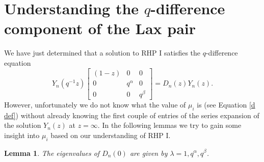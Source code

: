 \documentclass[a4paper,reqno]{amsart}
\numberwithin{equation}{section}
\newtheorem{lemma}[theorem]{Lemma}
\numberwithin{figure}{section}
\begin{document}
\section{Understanding the $q$-difference component of the Lax pair}
We have just determined that a solution to RHP I satisfies the $q$-difference equation 
\begin{equation}\label{the main diff}
    Y_n(q^{-1}z) \begin{bmatrix}
   (1-z) &
   0 &
   0 \\
   0 &
   q^{\alpha} &
   0\\
   0&0&q^{\beta}
\end{bmatrix} = D_n(z)Y_n(z).
\end{equation}
However, unfortunately we do not know what the value of $\mu_{i}$ is (see Equation \eqref{d def}) without already knowing the first couple of entries of the series expansion of the solution $Y_n(z)$ at $z=\infty$. In the following lemmas we try to gain some insight into $\mu_{i}$ based on our understanding of RHP I. 
\begin{lemma}
    The eigenvalues of $D_n(0)$ are given by $\lambda = 1,q^{\alpha},q^{\beta}$.
\end{lemma}
\end{document}
